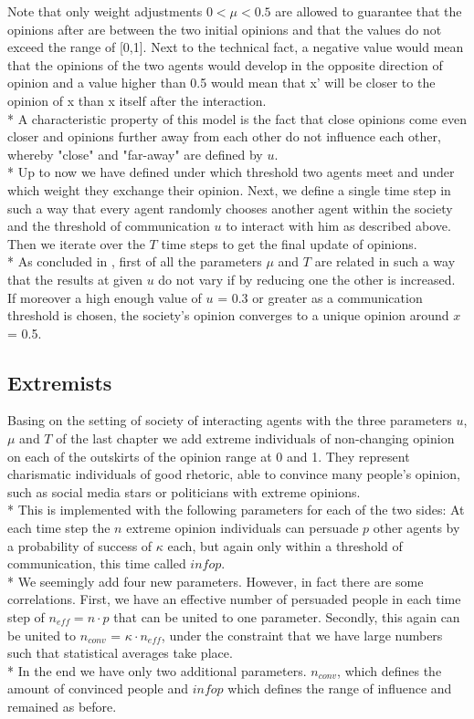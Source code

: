 \documentclass[11pt]{article}
\begin{document}
Note that only weight adjustments $0 < \mu < 0.5$ are allowed to guarantee that the opinions after are between the two initial opinions and that the values do not exceed the range of [0,1]. Next to the technical fact, a negative value would mean that the opinions of the two agents would develop in the opposite direction of opinion and a value higher than 0.5 would mean that x' will be closer to the opinion of x than x itself after the interaction. \\*
A characteristic property of this model is the fact that close opinions come even closer and opinions further away from each other do not influence each other, whereby "close" and "far-away" are defined by $u$. \\*
Up to now we have defined under which threshold two agents meet and under which weight they exchange their opinion. Next, we define a single time step in such a way that every agent randomly chooses another agent within the society and the threshold of communication $u$ to interact with him as described above. Then we iterate over the $T$ time steps to get the final update of opinions. \\*
As concluded in \cite{Minor}, first of all the parameters $\mu$ and $T$ are related in such a way that the results at given $u$ do not vary if by reducing one the other is increased. If moreover a high enough value of $u$ = 0.3 or greater as a communication threshold is chosen, the society's opinion converges to a unique opinion around $x$ = 0.5.

\subsection{Extremists}
Basing on the setting of society of interacting agents with the three parameters $u$, $\mu$ and $T$ of the last chapter we add extreme individuals of non-changing opinion on each of the outskirts of the opinion range at 0 and 1. They represent charismatic individuals of good rhetoric, able to convince many people's opinion, such as social media stars or politicians with extreme opinions. \\*
This is implemented with the following parameters for each of the two sides: At each time step the $n$ extreme opinion individuals can persuade $p$ other agents by a probability of success of $\kappa$ each, but again only within a threshold of communication, this time called $infop$. \\*
We seemingly add four new parameters. However, in fact there are some correlations.
First, we have an effective number of persuaded people in each time step of $n_{eff} = n \cdot p$ that can be united to one parameter. Secondly, this again can be united to $n_{conv}$ = $\kappa \cdot n_{eff}$, under the constraint that we have large numbers such that statistical averages take place. \\*
In the end we have only two additional parameters. $n_{conv}$, which defines the amount of convinced people and $infop$ which defines the range of influence and remained as before.
\end{document}
